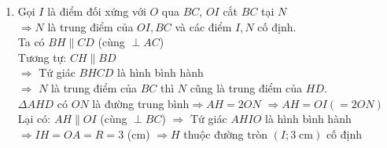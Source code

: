 \begin{bt}
{\begin{enumerate}
         \item Gọi $I$ là điểm đối xứng với $O$ qua $BC$, $OI$ cắt $BC$ tại $N$\\
          $\Rightarrow N$ là trung điểm của $OI, BC$ và các điểm $I,N$ cố định.\\
         Ta có $BH\parallel CD$ (cùng $\perp AC$)\\
         Tương tự: $CH\parallel BD$\\
         $\Rightarrow $ Tứ giác $BHCD$ là hình bình hành\\
         $\Rightarrow $ $N$ là trung điểm của $BC$ thì $N$ cũng là trung điểm của $HD$.\\
         $\Delta AHD$ có $ON$ là đường trung bình$\Rightarrow AH=2ON$ $\Rightarrow AH=OI\left(=2ON\right)$\\
         Lại có: $AH\parallel OI$ (cùng $\perp BC$)
         $\Rightarrow $ Tứ giác $AHIO$ là hình bình hành\\
         $\Rightarrow IH=OA=R=3$ (cm)
         $\Rightarrow H$ thuộc đường tròn $\left(I;3\;\text{cm}\right)$ cố định  
    \end{enumerate}
}
\end{bt}


